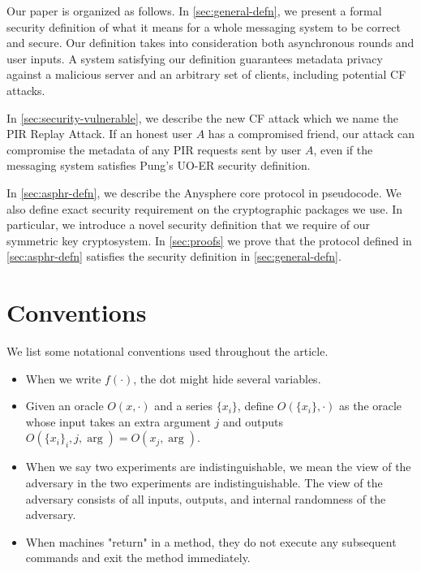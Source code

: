 Our paper is organized as follows. In \cref{sec:general-defn}, we present a formal security definition of what it means for a whole messaging system to be correct and secure. Our definition takes into consideration both asynchronous rounds and user inputs. A system satisfying our definition guarantees metadata privacy against a malicious server and an arbitrary set of clients, including potential CF attacks.

In \cref{sec:security-vulnerable}, we describe the new CF attack which we name the PIR Replay Attack. If an honest user $A$ has a compromised friend, our attack can compromise the metadata of any PIR requests sent by user $A$, even if the messaging system satisfies Pung's UO-ER security definition. 

In \cref{sec:asphr-defn}, we describe the Anysphere core protocol in pseudocode. We also define exact security requirement on the cryptographic packages we use. In particular, we introduce a novel security definition that we require of our symmetric key cryptosystem. In \cref{sec:proofs} we prove that the protocol defined in \cref{sec:asphr-defn} satisfies the security definition in \cref{sec:general-defn}.



\section{Conventions}
We list some notational conventions used throughout the article.
\begin{itemize}
    \item When we write $f(\cdot)$, the dot might hide several variables.
    
    \item Given an oracle $O(x, \cdot)$ and a series $\{x_i\}$, define $O(\{x_i\}, \cdot)$ as the oracle whose input takes an extra argument $j$ and outputs $O(\{x_i\}_i, j, \arg) = O(x_j, \arg)$.

    \item When we say two experiments are indistinguishable, we mean the view of the adversary in the two experiments are indistinguishable. The view of the adversary consists of all inputs, outputs, and internal randomness of the adversary.
    
    \item When machines "return" in a method, they do not execute any subsequent commands and exit the method immediately.
\end{itemize}

